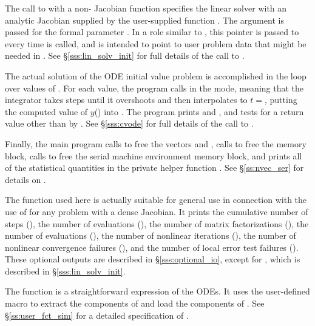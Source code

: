 The call to  with a non- Jacobian function 
 specifies the {\cvdense} linear solver with an analytic
Jacobian supplied by the user-supplied function . 
The  argument is passed for the  
formal parameter .  In a role similar to ,
this pointer is passed to  every time  is called, 
and is intended to point to user problem data that might be needed 
in .  See \S\ref{sss:lin_solv_init} for full details of the call
to .

The actual solution of the ODE initial value problem is accomplished
in the loop over values of .  For each value, the program
calls  in the  mode, meaning that the integrator
takes steps until it overshoots  and then interpolates to 
$t = $, putting the computed value of $y$() into
.  The program prints  and , and tests for a 
return value other than  by .  See 
\S\ref{sss:cvode} for full details of the call to .

Finally, the main program calls  to free the vectors
 and , calls  to free the {\cvodes}
memory block, calls  to free the serial machine
environment memory block, and prints all of the statistical quantities in the
private helper function .
See \S\ref{ss:nvec_ser} for details on .

The function  used here is actually suitable for
general use in connection with the use of {\cvodes} for any problem with 
a dense Jacobian.  It prints the cumulative number of steps
(), the number of  evaluations (), 
the number of matrix factorizations (), 
the number of  evaluations (), 
the number of nonlinear iterations (), 
the number of nonlinear convergence failures (), and 
the number of local error test failures ().
These optional outputs are described in \S\ref{sss:optional_io},
except for , which is described in 
\S\ref{sss:lin_solv_init}.

The function  is a straightforward expression of the ODEs. 
It uses the user-defined macro 
to extract the components of  and load the components of .
See \S\ref{ss:user_fct_sim} for a detailed specification of .

